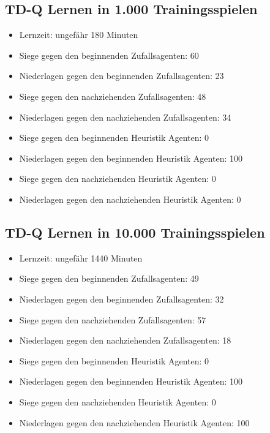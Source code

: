 \subsection{TD-Q Lernen in 1.000 Trainingsspielen}
\begin{itemize}
\item Lernzeit: ungefähr 180 Minuten

\item Siege gegen den beginnenden Zufallsagenten: 60
\item Niederlagen gegen den beginnenden Zufallsagenten: 23 

\item Siege gegen den nachziehenden Zufallsagenten: 48
\item Niederlagen gegen den nachziehenden Zufallsagenten: 34 

\item Siege gegen den beginnenden Heuristik Agenten: 0
\item Niederlagen gegen den beginnenden Heuristik Agenten: 100

\item Siege gegen den nachziehenden Heuristik Agenten: 0
\item Niederlagen gegen den nachziehenden Heuristik Agenten: 0

\end{itemize}


\subsection{TD-Q Lernen in 10.000 Trainingsspielen}
\begin{itemize}
\item Lernzeit: ungefähr 1440 Minuten

\item Siege gegen den beginnenden Zufallsagenten: 49
\item Niederlagen gegen den beginnenden Zufallsagenten: 32 

\item Siege gegen den nachziehenden Zufallsagenten: 57
\item Niederlagen gegen den nachziehenden Zufallsagenten: 18 

\item Siege gegen den beginnenden Heuristik Agenten: 0
\item Niederlagen gegen den beginnenden Heuristik Agenten: 100 

\item Siege gegen den nachziehenden Heuristik Agenten: 0
\item Niederlagen gegen den nachziehenden Heuristik Agenten: 100 
\end{itemize}

